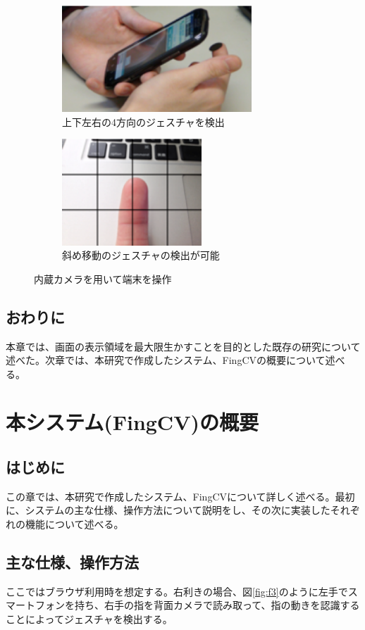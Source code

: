 \documentclass[11pt,a4j, titlepage]{jarticle} %
\begin{document}
\begin{figure}[H]
	\centering
	\begin{subfigure}{0.4\columnwidth}
		\centering
		\includegraphics[width=\columnwidth,height=4cm]{cameragesture1.eps}
		\caption{上下左右の4方向のジェスチャを検出}
		\label{fig:1a}
	\end{subfigure}
	\begin{subfigure}{0.4\columnwidth}
		\centering
		\includegraphics[width=\columnwidth,height=4cm]{cameragesture2.eps}
		\caption{斜め移動のジェスチャの検出が可能}
		\label{fig:1b}
	\end{subfigure}
	\caption{内蔵カメラを用いて端末を操作}
	\label{fig:f2}
\end{figure}

\subsection{おわりに}
本章では、画面の表示領域を最大限生かすことを目的とした既存の研究について述べた。次章では、本研究で作成したシステム、FingCVの概要について述べる。

\newpage
\section{本システム(FingCV)の概要}
\subsection{はじめに}
この章では、本研究で作成したシステム、FingCVについて詳しく述べる。最初に、システムの主な仕様、操作方法について説明をし、その次に実装したそれぞれの機能について述べる。
\subsection{主な仕様、操作方法}
ここではブラウザ利用時を想定する。右利きの場合、図\ref{fig:f3}のように左手でスマートフォンを持ち、右手の指を背面カメラで読み取って、指の動きを認識することによってジェスチャを検出する。
\end{document}
